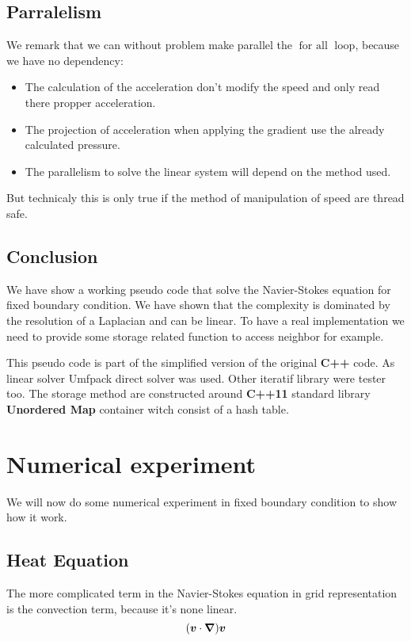 \subsection{Parralelism}

We remark that we can without problem make parallel the $\mathop{\textbf{for all}}$ loop, because we have no dependency:
\begin{itemize}
 \item The calculation of the acceleration don't modify the speed and only read there propper acceleration.
 \item The projection of acceleration when applying the gradient use the already calculated pressure.
 \item The parallelism to solve the linear system will depend on the method used.
\end{itemize}

But technicaly this is only true if the method of manipulation of speed are thread safe.

\subsection{Conclusion}

We have show a working pseudo code that solve the Navier-Stokes equation for fixed boundary condition.
We have shown that the complexity is dominated by the resolution of a Laplacian and can be linear.
To have a real implementation we need to provide some storage related function to access neighbor for example.

This pseudo code is part of the simplified version of the original \textbf{C++} code.
As linear solver Umfpack direct solver was used. Other iteratif library were tester too.
The storage method are constructed around \textbf{C++11} standard library \textbf{Unordered Map} container witch consist of a hash table.

\section{Numerical experiment}

We will now do some numerical experiment in fixed boundary condition to show how it work.

\subsection{Heat Equation}

The more complicated term in the Navier-Stokes equation in grid representation is the convection term, because it's none linear.
\begin{equation}
	({\boldsymbol {v}}\cdot {\boldsymbol {\nabla}}){\boldsymbol {v}}
\end{equation}


